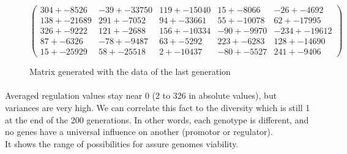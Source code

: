 \documentclass[]{report} %
\begin{document}
    \begin{figure}[H] 
            \centering
            \small
    $
            \begin{pmatrix}
                304 +- 8526 & -39 +- 33750 & 119 +- 15040 & 15 +- 8066 & -26 +- 4692 \\
                138 +- 21689 & 291 +- 7052 & 94 +- 33661 & 55 +- 10078 & 62 +- 17995 \\
                326 +- 9222 & 121 +- 2688 & 156 +- 10334 & -90 +- 9970 & -234 +- 19612 \\
                87 +- 6326 & -78 +- 9487 & 63 +- 5292 & 223 +- 6283 & 128 +- 14690 \\
                15 +- 25929 & 58 +- 25518 & 2 +- 10437 & -80 +- 5527 & 241 +- 9406 
            \end{pmatrix}
    $
            \caption{\footnotesize Matrix generated with the data of the last generation}
            \label{mat:ps300xg200xmr1-10-0}
    \end{figure}
    \paragraph*{}
    Averaged regulation values stay near 0 (2 to 326 in absolute values), but variances are very high. We can correlate this fact to the diversity which is still 1 at the end of the 200 generations. 
    In other words, each genotype is different, and no genes have a universal influence on another (promotor or regulator).\\
    It shows the range of possibilities for assure genomes viability.
    
    
    \newpage
\end{document}
